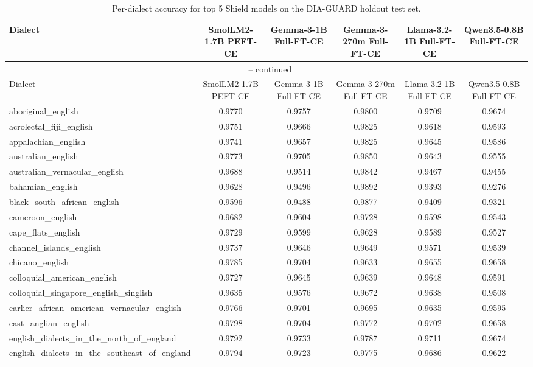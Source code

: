 \begin{longtable}{lccccc}
\caption{Per-dialect accuracy for top 5 Shield models on the DIA-GUARD holdout test set.} \\
\label{tab:shield_per_dialect}
\toprule
Dialect & SmolLM2-1.7B PEFT-CE & Gemma-3-1B Full-FT-CE & Gemma-3-270m Full-FT-CE & Llama-3.2-1B Full-FT-CE & Qwen3.5-0.8B Full-FT-CE \\
\midrule
\endfirsthead
\multicolumn{6}{c}{\tablename\ \thetable{} -- continued} \\
\toprule
Dialect & SmolLM2-1.7B PEFT-CE & Gemma-3-1B Full-FT-CE & Gemma-3-270m Full-FT-CE & Llama-3.2-1B Full-FT-CE & Qwen3.5-0.8B Full-FT-CE \\
\midrule
\endhead
aboriginal\_english & 0.9770 & 0.9757 & 0.9800 & 0.9709 & 0.9674 \\
acrolectal\_fiji\_english & 0.9751 & 0.9666 & 0.9825 & 0.9618 & 0.9593 \\
appalachian\_english & 0.9741 & 0.9657 & 0.9825 & 0.9645 & 0.9586 \\
australian\_english & 0.9773 & 0.9705 & 0.9850 & 0.9643 & 0.9555 \\
australian\_vernacular\_english & 0.9688 & 0.9514 & 0.9842 & 0.9467 & 0.9455 \\
bahamian\_english & 0.9628 & 0.9496 & 0.9892 & 0.9393 & 0.9276 \\
black\_south\_african\_english & 0.9596 & 0.9488 & 0.9877 & 0.9409 & 0.9321 \\
cameroon\_english & 0.9682 & 0.9604 & 0.9728 & 0.9598 & 0.9543 \\
cape\_flats\_english & 0.9729 & 0.9599 & 0.9628 & 0.9589 & 0.9527 \\
channel\_islands\_english & 0.9737 & 0.9646 & 0.9649 & 0.9571 & 0.9539 \\
chicano\_english & 0.9785 & 0.9704 & 0.9633 & 0.9655 & 0.9658 \\
colloquial\_american\_english & 0.9727 & 0.9645 & 0.9639 & 0.9648 & 0.9591 \\
colloquial\_singapore\_english\_singlish & 0.9635 & 0.9576 & 0.9672 & 0.9638 & 0.9508 \\
earlier\_african\_american\_vernacular\_english & 0.9766 & 0.9701 & 0.9695 & 0.9635 & 0.9595 \\
east\_anglian\_english & 0.9798 & 0.9704 & 0.9772 & 0.9702 & 0.9658 \\
english\_dialects\_in\_the\_north\_of\_england & 0.9792 & 0.9733 & 0.9787 & 0.9711 & 0.9674 \\
english\_dialects\_in\_the\_southeast\_of\_england & 0.9794 & 0.9723 & 0.9775 & 0.9686 & 0.9622 \\

\end{longtable}
